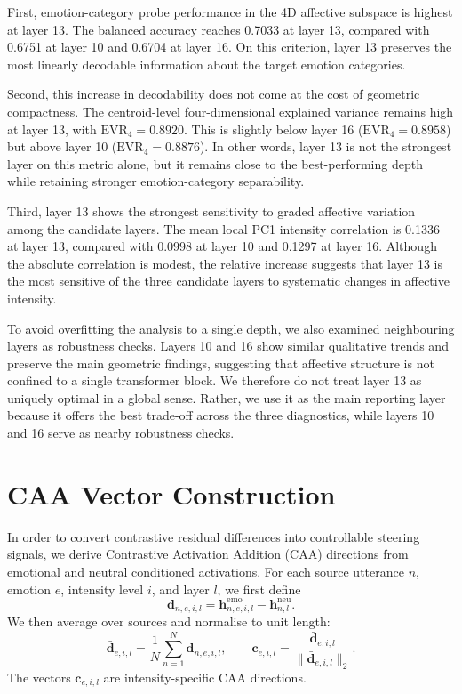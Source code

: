 First, emotion-category probe performance in the 4D affective subspace is highest at layer 13. The balanced accuracy reaches 0.7033 at layer 13, compared with 0.6751 at layer 10 and 0.6704 at layer 16. On this criterion, layer 13 preserves the most linearly decodable information about the target emotion categories.

Second, this increase in decodability does not come at the cost of geometric compactness. The centroid-level four-dimensional explained variance remains high at layer 13, with $\mathrm{EVR}_{4}=0.8920$. This is slightly below layer 16 ($\mathrm{EVR}_{4}=0.8958$) but above layer 10 ($\mathrm{EVR}_{4}=0.8876$). In other words, layer 13 is not the strongest layer on this metric alone, but it remains close to the best-performing depth while retaining stronger emotion-category separability.

Third, layer 13 shows the strongest sensitivity to graded affective variation among the candidate layers. The mean local PC1 intensity correlation is 0.1336 at layer 13, compared with 0.0998 at layer 10 and 0.1297 at layer 16. Although the absolute correlation is modest, the relative increase suggests that layer 13 is the most sensitive of the three candidate layers to systematic changes in affective intensity.

To avoid overfitting the analysis to a single depth, we also examined neighbouring layers as robustness checks. Layers 10 and 16 show similar qualitative trends and preserve the main geometric findings, suggesting that affective structure is not confined to a single transformer block. We therefore do not treat layer 13 as uniquely optimal in a global sense. Rather, we use it as the main reporting layer because it offers the best trade-off across the three diagnostics, while layers 10 and 16 serve as nearby robustness checks.

\section{CAA Vector Construction}

In order to convert contrastive residual differences into controllable steering signals, we derive Contrastive Activation Addition (CAA) directions from emotional and neutral conditioned activations. For each source utterance $n$, emotion $e$, intensity level $i$, and layer $l$, we first define
\[
\mathbf{d}_{n,e,i,l}=\mathbf{h}^{\mathrm{emo}}_{n,e,i,l}-\mathbf{h}^{\mathrm{neu}}_{n,l}.
\]
We then average over sources and normalise to unit length:
\[
\bar{\mathbf{d}}_{e,i,l}=\frac{1}{N}\sum_{n=1}^{N}\mathbf{d}_{n,e,i,l},
\qquad
\mathbf{c}_{e,i,l}=\frac{\bar{\mathbf{d}}_{e,i,l}}{\lVert\bar{\mathbf{d}}_{e,i,l}\rVert_2}.
\]
The vectors $\mathbf{c}_{e,i,l}$ are intensity-specific CAA directions.

